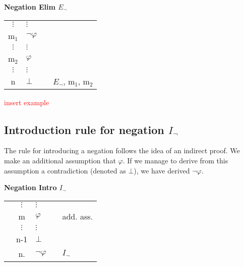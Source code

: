 \documentclass[nobib,nofonts]{tufte-handout}
\begin{document}
\bigskip
\noindent \colorbox{mygray!60}{\centering
  \begin{minipage}[t]{0.35\linewidth}
    \textbf{Negation Elim $E_{\neg}$}
  \end{minipage}
  \begin{minipage}[t]{0.55\linewidth}
    \begin{tabular}{clcl}
            $\vdots$ & $\vdots$       & \\
      m$_{1}$        & $\neg \varphi$ &  \\
            $\vdots$ & $\vdots$       & \\
      m$_{2}$        & $\varphi$      &  \\
            $\vdots$ & $\vdots$       & \\
      n             & $\bot$         & & $E_{\neg}$, m$_{1}$, m$_{2}$
    \end{tabular}
  \end{minipage}
}
\bigskip


\textcolor{red}{insert example}

\subsection{Introduction rule for negation $I_{\neg}$}

The rule for introducing a negation follows the idea of an indirect proof.
We make an additional assumption that $\varphi$.
If we manage to derive from this assumption a contradiction (denoted as $\bot$), we have derived $\neg \varphi$.

\bigskip
\noindent \colorbox{mygray!60}{\centering
  \begin{minipage}[t]{0.35\linewidth}
    \textbf{Negation Intro $I_{\neg}$}
  \end{minipage}
  \begin{minipage}[t]{0.55\linewidth}
    \begin{tabular}{cclcl}
                         &                   $\vdots$ & $\vdots$       & \\
      \cline{1-2} \vline & m                          & $\varphi$      & & add. ass.  \\
      \vline             &                   $\vdots$ & $\vdots$       & \\
      \vline             & n-1                        & $\bot$         & & \\ \hline
                         & n.                         & $\neg \varphi$ & & $I_{\neg}$
    \end{tabular}
  \end{minipage}
}
\bigskip
\end{document}
